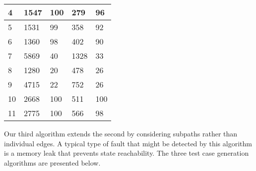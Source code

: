 \documentclass[journal, twoside]{IEEEtran}
\begin{document}
\begin{table}[ht]
\begin{tabular}{|l|l|l|l|l|}
4                                                        & 1547                                                      & 100                                                                 & 279                                                        & 96                                                                  \\ \hline
5                                                        & 1531                                                      & 99                                                                  & 358                                                        & 92                                                                  \\ \hline
6                                                        & 1360                                                      & 98                                                                  & 402                                                        & 90                                                                  \\ \hline
7                                                        & 5869                                                      & 40                                                                  & 1328                                                       & 33                                                                  \\ \hline
8                                                        & 1280                                                      & 20                                                                  & 478                                                        & 26                                                                  \\ \hline
9                                                        & 4715                                                      & 22                                                                  & 752                                                        & 26                                                                  \\ \hline
10                                                       & 2668                                                      & 100                                                                 & 511                                                        & 100                                                                 \\ \hline
11                                                       & 2775                                                      & 100                                                                 & 566                                                        & 98                                                                  \\ \hline
\end{tabular}
    
\end{table}
Our third algorithm extends the second by considering subpaths rather than individual edges. A typical type of fault that
might be detected by this algorithm is a memory leak that prevents state reachability. The three test case generation algorithms are presented below. 
\end{document}
